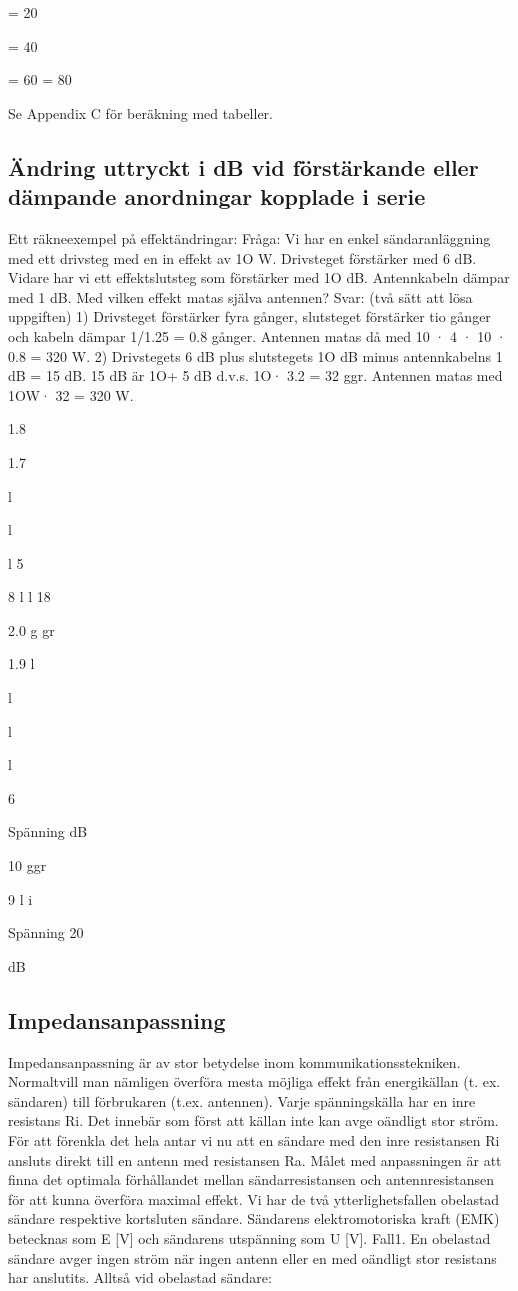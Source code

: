 \documentclass[a4paper,twoside,twocolumn,openright]{book}
\begin{document}
{{= 20

= 40

= 60
= 80

Se Appendix C för beräkning med tabeller.

\subsection{Ändring uttryckt i dB vid förstärkande eller
dämpande anordningar kopplade i serie}

Ett räkneexempel på effektändringar:
Fråga:
Vi har en enkel sändaranläggning med
ett drivsteg med en in effekt av 1O W. Drivsteget förstärker med 6 dB. Vidare har vi ett
effektslutsteg som förstärker med 1O dB.
Antennkabeln dämpar med 1 dB.
Med vilken effekt matas själva antennen?
Svar: (två sätt att lösa uppgiften)
1) Drivsteget förstärker fyra gånger, slutsteget förstärker tio gånger och kabeln
dämpar 1/1.25 = 0.8 gånger. Antennen
matas då med 10 · 4 · 10 · 0.8 = 320 W.
2) Drivstegets 6 dB plus slutstegets 1O dB
minus antennkabelns 1 dB = 15 dB.
15 dB är 1O+ 5 dB d.v.s. 1O· 3.2 = 32 ggr.
Antennen matas med 1OW· 32 = 320 W.

1.8

1.7

l

l

l
5

8
l
l
18

2.0 g gr

1.9
l

l

l

l

6

Spänning
dB

10 ggr

9
l
i

Spänning
20

dB

\subsection{Impedansanpassning}
Impedansanpassning är av stor betydelse
inom kommunikationsstekniken. Normaltvill
man nämligen överföra mesta möjliga effekt
från energikällan (t. ex. sändaren) till förbrukaren (t.ex. antennen).
Varje spänningskälla har en inre resistans Ri. Det innebär som först att källan inte
kan avge oändligt stor ström. För att förenkla
det hela antar vi nu att en sändare med den
inre resistansen Ri ansluts direkt till en antenn med resistansen Ra.
Målet med anpassningen är att finna det
optimala förhållandet mellan sändarresistansen och antennresistansen för att kunna
överföra maximal effekt. Vi har de två ytterlighetsfallen obelastad sändare respektive
kortsluten sändare. Sändarens elektromotoriska kraft (EMK) betecknas som E [V]
och sändarens utspänning som U [V].
Fall1.
En obelastad sändare avger ingen ström när
ingen antenn eller en med oändligt stor resistans har anslutits.
Alltså vid obelastad sändare:

}}
\end{document}
